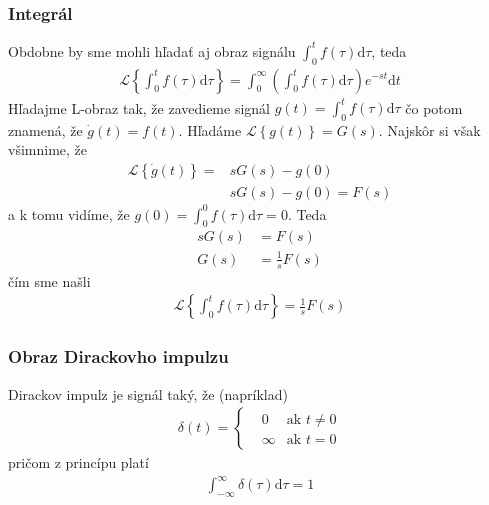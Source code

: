 \documentclass[a4paper, 10pt, ]{article}
\begin{document}
\subsubsection{Integrál}

Obdobne by sme mohli hľadať aj obraz signálu $\int_0^t f(\tau) \text{d}\tau$, teda
\begin{align}
    \mathcal L \left\{ \int_0^t f(\tau) \text{d}\tau \right\} = \int_0^\infty \left(\int_0^t f(\tau) \text{d}\tau \right) e^{-st}\text{d}t
\end{align}
Hľadajme L-obraz tak, že zavedieme signál $g(t) = \int_0^t f(\tau) \text{d}\tau$ čo potom znamená, že $\dot g(t) = f(t)$. Hľadáme $\mathcal L \left\{ g(t) \right\} = G(s)$. Najskôr si však všimnime, že
\begin{equation}
    \begin{aligned}
        \mathcal L \left\{ \dot g(t) \right\} =& s G(s) - g(0) \\
        & s G(s) - g(0) = F(s)
    \end{aligned}
\end{equation}
a k tomu vidíme, že $g(0) = \int_0^0 f(\tau) \text{d}\tau = 0$. Teda
\begin{subequations}
    \begin{align}
        sG(s) &= F(s) \\
        G(s) &= \frac{1}{s} F(s)
    \end{align}
\end{subequations}
čím sme našli
\begin{align}
    \mathcal L \left\{ \int_0^t f(\tau) \text{d}\tau \right\} = \frac{1}{s} F(s)
\end{align}






\subsubsection{Obraz Dirackovho impulzu}

Dirackov impulz je signál taký, že (napríklad)
\begin{align}
    \delta(t) =
    \left\{
        \begin{aligned}
            &0 & \text{ak $t \neq 0$} \\
            &\infty & \text{ak $t = 0$}
        \end{aligned}
    \right.
\end{align}
pričom z princípu platí
\begin{align}
    \int_{-\infty}^\infty \delta(\tau) \text{d}\tau = 1
\end{align}
\end{document}
